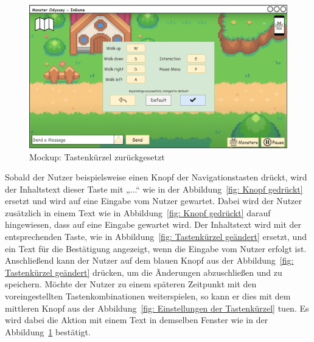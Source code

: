 \begin{figure}[H]
    \center
    \includegraphics[scale=\scale]{images/mockups/Bonusfeatures/Keybindings/KeybindingsSettingsDefault.png}
    \caption{Mockup: Tastenkürzel zurückgesetzt}
    \label{fig: Tastenkürzel zurückgesetzt}
\end{figure}
Sobald der Nutzer beispielsweise einen Knopf der Navigationstasten drückt, wird der Inhaltstext dieser Taste mit „...“ wie in der Abbildung~\ref{fig: Knopf gedrückt} ersetzt und wird auf eine Eingabe vom Nutzer gewartet. Dabei wird der Nutzer zusätzlich in einem Text wie in Abbildung~\ref{fig: Knopf gedrückt} darauf hingewiesen, dass auf eine Eingabe gewartet wird. Der Inhaltstext wird mit der entsprechenden Taste, wie in Abbildung~\ref{fig: Tastenkürzel geändert} ersetzt, und ein Text für die Bestätigung angezeigt, wenn die Eingabe vom Nutzer erfolgt ist. Anschließend kann der Nutzer auf dem blauen Knopf aus der Abbildung~\ref{fig: Tastenkürzel geändert} drücken, um die Änderungen abzuschließen und zu speichern.
Möchte der Nutzer zu einem späteren Zeitpunkt mit den voreingestellten Tastenkombinationen weiterspielen, so kann er dies mit dem mittleren Knopf aus der Abbildung~\ref{fig: Einstellungen der Tastenkürzel} tuen. Es wird dabei die Aktion mit einem Text in demselben Fenster wie in der Abbildung~\ref{fig: Tastenkürzel zurückgesetzt} bestätigt.

